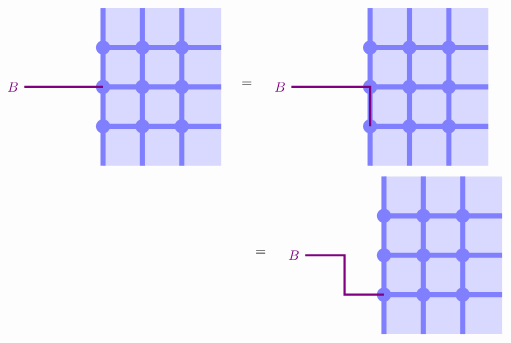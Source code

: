 \documentclass[report,paper=a4, fontsize=12pt, line_length=16cm, number_of_lines=33,dvipdfmx]{jlreq}
\numberwithin{equation}{chapter}
\begin{document}
\begin{align}
    \begin{tikzpicture}[baseline=0cm]
        \foreach \x in {0,1,2}{
            \foreach \y in {-2,-1,...,1}{
            \fill[plaqblue](\x,\y) rectangle (\x+1,\y+1);
            }
        }
        \foreach \x in {0,1,2}{
            \foreach \y in {-1,0,1}{
                \fill[linkblue] (\x,\y) circle (1.8mm);
            }
        }
        \foreach \x in {0,1,2}{
            \foreach \y in {-1,0,1}{
                \draw[linkblue, line width = 1.3mm](\x,\y)--(\x + 1,\y);
            }
        }
        \foreach \x in {0,1,2}{
            \foreach \y in {-2,-1,...,1}{
                \draw[linkblue, line width = 1.3mm](\x,\y)--(\x,\y + 1);
            }
        }
        \draw[red!50!blue, ultra thick](0,0)--(-2,0) node[left]{$B$};
    \end{tikzpicture}
    \quad = \quad
    \begin{tikzpicture}[baseline=0cm]
        \foreach \x in {0,1,2}{
            \foreach \y in {-2,-1,...,1}{
            \fill[plaqblue](\x,\y) rectangle (\x+1,\y+1);
            }
        }
        \foreach \x in {0,1,2}{
            \foreach \y in {-1,0,1}{
                \fill[linkblue] (\x,\y) circle (1.8mm);
            }
        }
        \foreach \x in {0,1,2}{
            \foreach \y in {-1,0,1}{
                \draw[linkblue, line width = 1.3mm](\x,\y)--(\x + 1,\y);
            }
        }
        \foreach \x in {0,1,2}{
            \foreach \y in {-2,-1,...,1}{
                \draw[linkblue, line width = 1.3mm](\x,\y)--(\x,\y + 1);
            }
        }
        \draw[red!50!blue, ultra thick](0,-1)--(0,0)--(-2,0) node[left]{$B$};
    \end{tikzpicture}    
    \quad \notag \\= \quad
    \begin{tikzpicture}[baseline=0cm]
        \foreach \x in {0,1,2}{
            \foreach \y in {-2,-1,...,1}{
            \fill[plaqblue](\x,\y) rectangle (\x+1,\y+1);
            }
        }
        \foreach \x in {0,1,2}{
            \foreach \y in {-1,0,1}{
                \fill[linkblue] (\x,\y) circle (1.8mm);
            }
        }
        \foreach \x in {0,1,2}{
            \foreach \y in {-1,0,1}{
                \draw[linkblue, line width = 1.3mm](\x,\y)--(\x + 1,\y);
            }
        }
        \foreach \x in {0,1,2}{
            \foreach \y in {-2,-1,...,1}{
                \draw[linkblue, line width = 1.3mm](\x,\y)--(\x,\y + 1);
            }
        }
        \draw[red!50!blue, ultra thick](0,-1)--(-1,-1)--(-1,0)--(-2,0) node[left]{$B$};
    \end{tikzpicture}    
\end{align}
\end{document}
